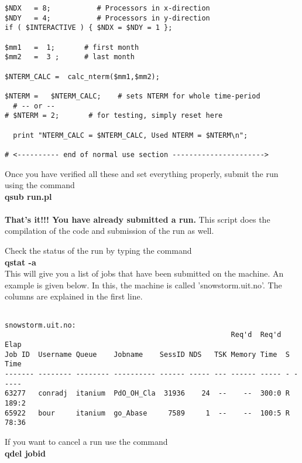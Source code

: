 \begin{verbatim}
$NDX   = 8;           # Processors in x-direction
$NDY   = 4;           # Processors in y-direction
if ( $INTERACTIVE ) { $NDX = $NDY = 1 };

$mm1   =  1;       # first month
$mm2   =  3 ;      # last month

$NTERM_CALC =  calc_nterm($mm1,$mm2);

$NTERM =   $NTERM_CALC;    # sets NTERM for whole time-period
  # -- or --
# $NTERM = 2;       # for testing, simply reset here

  print "NTERM_CALC = $NTERM_CALC, Used NTERM = $NTERM\n";

# <---------- end of normal use section ---------------------->
\end{verbatim}


Once you have verified all these and set everything properly, submit
the run using the command \\

\textbf{qsub run.pl}\\
\\

\textbf{That's it!!!  You have already submitted a run.}  This script
does the compilation of the code and submission of the run as well.    

Check the status of the run by typing the command\\

\textbf{qstat -a}\\

This will give you a list of jobs that have been submitted on the
machine. An example is given below.  In this, the machine is called
'snowstorm.uit.no'.  The columns are explained in the first line.   

\begin{verbatim}

snowstorm.uit.no:
                                                      Req'd  Req'd   Elap
Job ID  Username Queue    Jobname    SessID NDS   TSK Memory Time  S Time
------- -------- -------- ---------- ------ ----- --- ------ ----- - -----
63277   conradj  itanium  PdO_OH_Cla  31936    24  --    --  300:0 R 189:2
65922   bour     itanium  go_Abase     7589     1  --    --  100:5 R 78:36

\end{verbatim}


If you want to cancel a run use the command \\

\textbf{qdel jobid}\\



